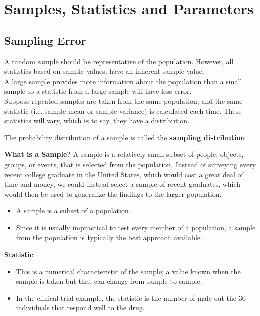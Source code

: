﻿\documentclass[]{report}
\begin{document}

\section{Samples, Statistics and Parameters}


\subsection{Sampling Error}
A random sample should be representative of the population. However, all statistics based on sample values, have an inherent sample value.
\\

A large sample provides more information about the population than a small sample so a statistic from a large sample will have less error.
\\ \bigskip
Suppose repeated samples are taken from the same population, and the same statistic (i.e. sample mean or sample variance) is calculated each time. These statistics will vary, which is to say, they have a distribution.

The probability distribution of a sample is called the \textbf{sampling distribution}.


\noindent \textbf{What is a Sample?}
A sample is a relatively small subset of people, objects, groups, or events, that is selected from the population. Instead of surveying every recent college graduate in the United States, which would cost a great deal of time and money, we could instead select a sample of recent graduates, which would then be used to generalize the findings to the larger population.


\begin{itemize}
\item A sample is a subset of a population.
\item Since it is usually impractical to test every member of a population, a sample from the population is typically the best approach available.
\end{itemize}

\noindent \textbf{Statistic}
\begin{itemize}
\item This is a numerical characteristic of the sample; a value
known when the sample is taken but that can change from sample to
sample.\\

\item In the clinical trial example, the statistic is the number of male
out the 30 individuals that respond well to the drug.
\end{itemize}
\end{document}
